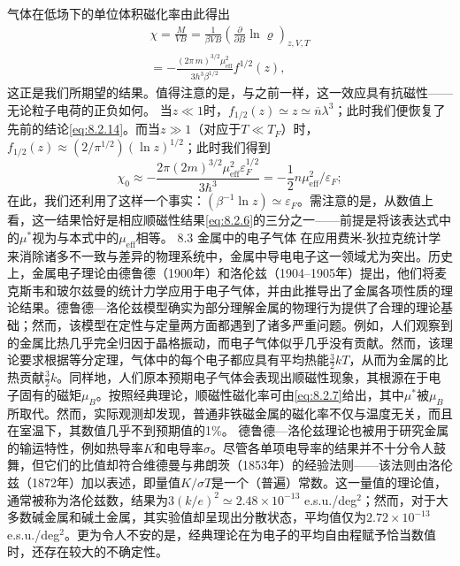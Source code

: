 气体在低场下的单位体积磁化率由此得出
\begin{equation}\tag{8.2.19}\label{eq:8.2.19}
\begin{array}{r} { \chi = \frac { M } { V B } = \frac { 1 } { \beta V B } \left( \frac { \partial } { \partial B } \ln \varrho \right) _ { z , V , T } } \\{ = - \frac { ( 2 \pi \, m ) ^{3 / 2} \mu _ { \mathrm { e f f } } ^{2} } { 3 h ^{3} \beta ^{1 / 2} } f ^{1 / 2} ( z ) , } \end{array}
\end{equation}
这正是我们所期望的结果。值得注意的是，与之前一样，这一效应具有抗磁性——无论粒子电荷的正负如何。
当\(z\ll1\)时，\(f_{1/2}(z)\simeq z\simeq\overline{n}\lambda^{3}\)；此时我们便恢复了先前的结论\autoref{eq:8.2.14}。而当\(z\gg1\)（对应于\(T\ll T_{F}\)）时，\(f_{1/2}(z)\approx(2/\pi^{1/2})(\ln z)^{1/2}\)；此时我们得到
\begin{equation}\tag{8.2.20}\label{eq:8.2.20}
\chi _ { 0 } \approx - \frac { 2 \pi ( 2 m ) ^{3 / 2} \mu _ { \mathrm { e f f } } ^{2} \varepsilon _ { F } ^{1 / 2} } { 3 \hbar ^{3} } = - \frac { 1 } { 2 } n \mu _ { \mathrm { e f f } } ^{2} / \varepsilon _ { F } ;
\end{equation}
在此，我们还利用了这样一个事实：\((\beta^{-1} \ln z) \simeq \varepsilon_F\)。需注意的是，从数值上看，这一结果恰好是相应顺磁性结果\autoref{eq:8.2.6}的三分之一——前提是将该表达式中的\(\mu^*\)视为与本式中的\(\mu_{\mathrm{eff}}\)相等。
8.3 金属中的电子气体
在应用费米-狄拉克统计学来消除诸多不一致与差异的物理系统中，金属中导电电子这一领域尤为突出。历史上，金属电子理论由德鲁德（1900年）和洛伦兹（1904--1905年）提出，他们将麦克斯韦和玻尔兹曼的统计力学应用于电子气体，并由此推导出了金属各项性质的理论结果。德鲁德---洛伦兹模型确实为部分理解金属的物理行为提供了合理的理论基础；然而，该模型在定性与定量两方面都遇到了诸多严重问题。例如，人们观察到的金属比热几乎完全归因于晶格振动，而电子气体似乎几乎没有贡献。然而，该理论要求根据等分定理，气体中的每个电子都应具有平均热能\(\frac{3}{2}kT\)，从而为金属的比热贡献\(\frac{3}{2}k\)。同样地，人们原本预期电子气体会表现出顺磁性现象，其根源在于电子固有的磁矩\(\mu_{B}\)。按照经典理论，顺磁性磁化率可由\autoref{eq:8.2.7}给出，其中\(\mu^{*}\)被\(\mu_{B}\)所取代。然而，实际观测却发现，普通非铁磁金属的磁化率不仅与温度无关，而且在室温下，其数值几乎不到预期值的1\%。
德鲁德---洛伦兹理论也被用于研究金属的输运特性，例如热导率\(K\)和电导率\(\sigma\)。尽管各单项电导率的结果并不十分令人鼓舞，但它们的比值却符合维德曼与弗朗茨（1853年）的经验法则——该法则由洛伦兹（1872年）加以表述，即量值\(K/\sigma T\)是一个（普遍）常数。这一量值的理论值，通常被称为洛伦兹数，结果为\(3(k/e)^2 \simeq 2.48 \times 10^{-13}\) e.s.u./deg\(^2\)；然而，对于大多数碱金属和碱土金属，其实验值却呈现出分散状态，平均值仅为\(2.72 \times 10^{-13}\) e.s.u./deg\(^2\)。更为令人不安的是，经典理论在为电子的平均自由程赋予恰当数值时，还存在较大的不确定性。
